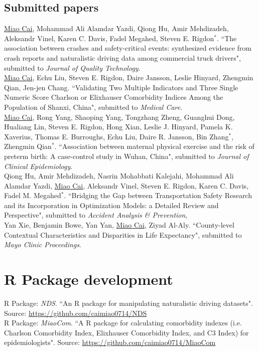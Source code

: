 \documentclass[11pt, a4paper]{article}
\newcommand{\years}[1]{\marginnote{\scriptsize #1}}
\begin{document}
\subsection*{Submitted papers}
\noindent
\years{2019}\underline{Miao Cai},  Mohammad Ali Alamdar Yazdi, Qiong Hu, Amir Mehdizadeh, Aleksandr Vinel, Karen C. Davis, Fadel Megahed, Steven E. Rigdon$^\ast$. ``The association between crashes and safety-critical events: synthesized evidence from crash reports and naturalistic driving data among commercial truck drivers", submitted to \emph{Journal of Quality Technology}.\\
\years{2019}\underline{Miao Cai}, Echu Liu, Steven E. Rigdon, Daire Jansson, Leslie Hinyard, Zhengmin Qian, Jen-jen Chang. ``Validating Two Multiple Indicators and Three Single Numeric Score Charlson or Elixhauser Comorbidity Indices Among the Population of Shanxi, China", submitted to \emph{Medical Care}.\\
\years{2019}\underline{Miao Cai}, Rong Yang, Shaoping Yang, Tongzhang Zheng, Guanghui Dong, Hualiang Lin, Steven E. Rigdon, Hong Xian, Leslie J. Hinyard, Pamela K. Xaverius, Thomas E. Burroughs, Echu Liu, Daire R. Jansson, Bin Zhang$^\ast$, Zhengmin Qian$^\ast$. ``Association between maternal physical exercise and the risk of preterm birth: A case-control study in Wuhan, China", submitted to \emph{Journal of Clinical Epidemiology}.\\
\years{2019}Qiong Hu, Amir Mehdizadeh, Nasrin Mohabbati Kalejahi, Mohammad Ali Alamdar Yazdi, \underline{Miao Cai}, Aleksandr Vinel, Steven E. Rigdon, Karen C. Davis, Fadel M. Megahed$^\ast$. ``Bridging the Gap between Transportation Safety Research and its Incorporation in Optimization Models: a Detailed Review and Perspective", submitted to \emph{Accident Analysis \& Prevention},\\
\years{2019}Yan Xie, Benjamin Bowe, Yan Yan, \underline{Miao Cai}, Ziyad Al-Aly. ``County-level Contextual Characteristics and Disparities in Life Expectancy", submitted to \emph{Mayo Clinic Proceedings}.


\clearpage
\section*{R Package development}
\years{2019}R Package: \emph{NDS}. ``An R package for manipulating naturalistic driving datasets". Source: \href{https://github.com/caimiao0714/NDS}{https://github.com/caimiao0714/NDS}\\
\years{2017}R Package: \emph{MiaoCom}. ``A R package for calculating comorbidity indexes (i.e. Charlson Comorbidity Index, Elixhauser Comorbidity Index, and C3 Index) for epidemiologists". Source: \href{https://github.com/caimiao0714/MiaoCom}{https://github.com/caimiao0714/MiaoCom}
\end{document}
